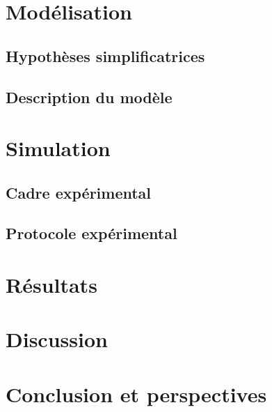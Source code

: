 \documentclass{article}
\begin{document}
\section{Modélisation}
\subsection{Hypothèses simplificatrices}
\subsection{Description du modèle}
\section{Simulation}
\subsection{Cadre expérimental}
\subsection{Protocole expérimental}
\section{Résultats}
\section{Discussion}
\section*{Conclusion et perspectives}
\end{document}
